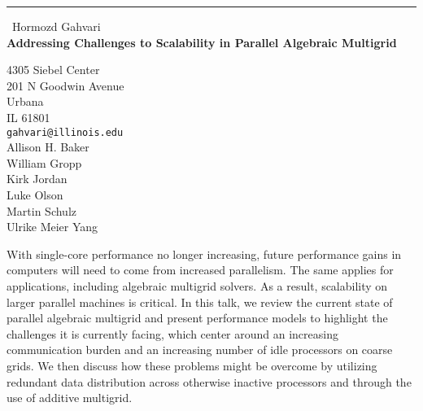 \documentclass{report}
\begin{document}
\begin{center}
\rule{6in}{1pt} \
{\large Hormozd Gahvari \\
{\bf Addressing Challenges to Scalability in Parallel Algebraic Multigrid}}

4305 Siebel Center \\ 201 N Goodwin Avenue \\ Urbana \\ IL 61801
\\
{\tt gahvari@illinois.edu}\\
Allison H. Baker\\
William Gropp\\
Kirk Jordan\\
Luke Olson\\
Martin Schulz\\
Ulrike Meier Yang\end{center}

With single-core performance no longer increasing, future performance
gains in computers will need to come from increased parallelism. The same
applies for applications, including algebraic multigrid solvers. As a
result, scalability on larger parallel machines is critical. In this
talk, we review the current state of parallel algebraic multigrid and
present performance models to highlight the challenges it is currently
facing, which center around an increasing communication burden and an
increasing number of idle processors on coarse grids. We then discuss how
these problems might be overcome by utilizing redundant data distribution
across otherwise inactive processors and through the use of additive
multigrid.
\end{document}
